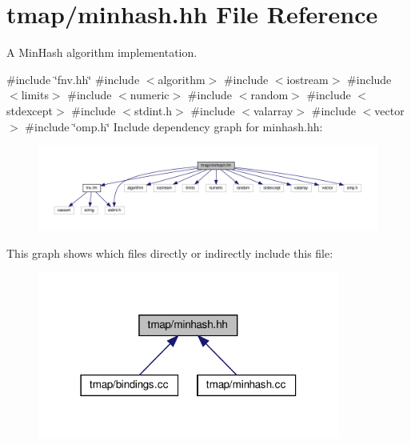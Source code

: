 \hypertarget{minhash_8hh}{}\section{tmap/minhash.hh File Reference}
\label{minhash_8hh}


A Min\+Hash algorithm implementation.  


{\ttfamily \#include \char`\"{}fnv.\+hh\char`\"{}}\newline
{\ttfamily \#include $<$algorithm$>$}\newline
{\ttfamily \#include $<$iostream$>$}\newline
{\ttfamily \#include $<$limits$>$}\newline
{\ttfamily \#include $<$numeric$>$}\newline
{\ttfamily \#include $<$random$>$}\newline
{\ttfamily \#include $<$stdexcept$>$}\newline
{\ttfamily \#include $<$stdint.\+h$>$}\newline
{\ttfamily \#include $<$valarray$>$}\newline
{\ttfamily \#include $<$vector$>$}\newline
{\ttfamily \#include \char`\"{}omp.\+h\char`\"{}}\newline
Include dependency graph for minhash.\+hh\+:\nopagebreak
\begin{figure}[H]
\begin{center}
\leavevmode
\includegraphics[width=350pt]{minhash_8hh__incl}
\end{center}
\end{figure}
This graph shows which files directly or indirectly include this file\+:\nopagebreak
\begin{figure}[H]
\begin{center}
\leavevmode
\includegraphics[width=282pt]{minhash_8hh__dep__incl}
\end{center}
\end{figure}
